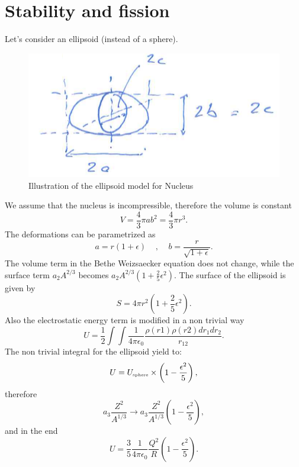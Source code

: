 \section{Stability and fission}
Let's consider an ellipsoid (instead of a sphere).
\begin{figure}
    \centering
    \includegraphics[scale=0.5]{Figures/nuclear-physics3-fig3.pdf}
    \caption{Illustration of the ellipsoid model for Nucleus}
    \label{fig:nuclear-physics3-fig3}
\end{figure}
We assume that the nucleus is incompressible, therefore the volume is constant
\begin{equation*}
    V = \frac{4}{3}\pi ab^2 = \frac{4}{3}\pi r^3.
\end{equation*}
The deformations can be parametrized as 
\begin{equation*}
    a = r(1+\epsilon) \;\;\;\;,\;\;\;\; b = \frac{r}{\sqrt{1+\epsilon}}.
\end{equation*}
The volume term in the Bethe Weizsaecker equation does not change, while the surface term $a_2A^{2/3}$ becomes $a_2A^{2/3}(1+\frac{2}{5}\epsilon^2)$.
The surface of the ellipsoid is given by
\begin{equation*}
    S = 4\pi r^2 \left(1+\frac{2}{5}\epsilon^2\right).
\end{equation*}
Also the electrostatic energy term is modified in a non trivial way
\begin{equation*}
    U = \frac{1}{2}\int \int \frac{1}{4\pi\epsilon_0} \frac{\rho(r1)\rho(r2)dr_1dr_2}{r_{12}}.
\end{equation*}
The non trivial integral for the ellipsoid yield to:
\begin{equation*}
    U = U_{\tiny\mbox{sphere}} \times \left(1-\frac{\epsilon^2}{5}\right),
\end{equation*}
therefore
\begin{equation*}
    a_3 \frac{Z^2}{A^{1/3}} \rightarrow a_3 \frac{Z^2}{A^{1/3}}\left(1-\frac{\epsilon^2}{5}\right),
\end{equation*}
and in the end
\begin{equation*}
    U = \frac{3}{5}\frac{1}{4\pi\epsilon_0}\frac{Q^2}{R}\left(1-\frac{\epsilon^2}{5}\right).
\end{equation*}


